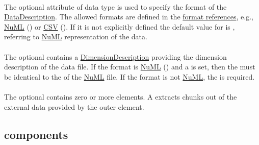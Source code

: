 \paragraph*{}
\label{sec:format}
The optional  attribute of data type \hyperref[type:urn]{} is used to specify the format of the \hyperref[class:dataDescription]{DataDescription}. The allowed formats are defined in the \hyperref[sec:dataFormatURN]{format references}, e.g., \hyperref[sec:dataFormatNUML]{NuML} () or \hyperref[sec:dataFormatCSV]{CSV} (). If it is not explicitly defined the default value for  is , referring to \hyperref[sec:dataFormatNUML]{NuML} representation of the data.

\paragraph*{}
\label{sec:dimensionDescription}
The optional  contains a \hyperref[class:dimensionDescription]{DimensionDescription} providing the dimension description of the data file. If the format is \hyperref[sec:dataFormatNUML]{NuML} () and a  is set, then the  must be identical to the  of the \hyperref[sec:dataFormatNUML]{NuML} file. If the format is not \hyperref[sec:dataFormatNUML]{NuML}, the  is required.

\paragraph*{}
\label{class:listOfDataSources}
The optional  contains zero or more \SedDataSource elements. A \SedDataSource extracts chunks out of the external data provided by the outer \SedDataDescription element. 

\subsection{ components}
\label{class:dataDescriptionComponents}


